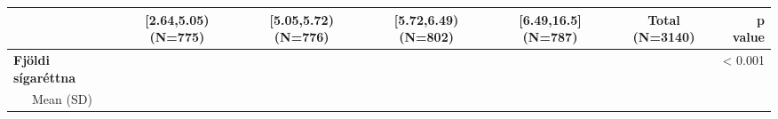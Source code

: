 \documentclass[
]{book}
\begin{document}
\begin{longtable}[]{@{}lcccccr@{}}
\toprule
\begin{minipage}[b]{0.17\columnwidth}\raggedright
\strut
\end{minipage} & \begin{minipage}[b]{0.12\columnwidth}\centering
{[}2.64,5.05) (N=775)\strut
\end{minipage} & \begin{minipage}[b]{0.12\columnwidth}\centering
{[}5.05,5.72) (N=776)\strut
\end{minipage} & \begin{minipage}[b]{0.12\columnwidth}\centering
{[}5.72,6.49) (N=802)\strut
\end{minipage} & \begin{minipage}[b]{0.12\columnwidth}\centering
{[}6.49,16.5{]} (N=787)\strut
\end{minipage} & \begin{minipage}[b]{0.10\columnwidth}\centering
Total (N=3140)\strut
\end{minipage} & \begin{minipage}[b]{0.05\columnwidth}\raggedleft
p value\strut
\end{minipage}\tabularnewline
\midrule
\endhead
\begin{minipage}[t]{0.17\columnwidth}\raggedright
\textbf{Fjöldi sígaréttna}\strut
\end{minipage} & \begin{minipage}[t]{0.12\columnwidth}\centering
\strut
\end{minipage} & \begin{minipage}[t]{0.12\columnwidth}\centering
\strut
\end{minipage} & \begin{minipage}[t]{0.12\columnwidth}\centering
\strut
\end{minipage} & \begin{minipage}[t]{0.12\columnwidth}\centering
\strut
\end{minipage} & \begin{minipage}[t]{0.10\columnwidth}\centering
\strut
\end{minipage} & \begin{minipage}[t]{0.05\columnwidth}\raggedleft
\textless{} 0.001\strut
\end{minipage}\tabularnewline
\begin{minipage}[t]{0.17\columnwidth}\raggedright
~~~Mean (SD)\strut
\end{minipage} & \begin{minipage}[t]{0.12\columnwidth}\centering

\end{minipage}
\end{longtable}
\end{document}

